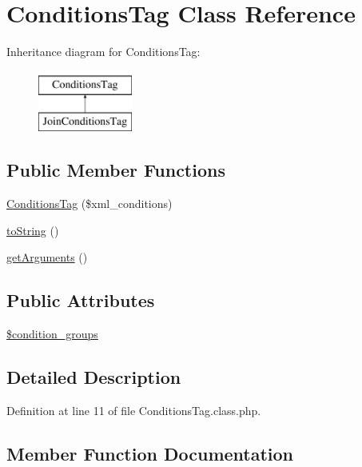 \hypertarget{classConditionsTag}{}\section{Conditions\+Tag Class Reference}
\label{classConditionsTag}
Inheritance diagram for Conditions\+Tag\+:\begin{figure}[H]
\begin{center}
\leavevmode
\includegraphics[height=2.000000cm]{classConditionsTag}
\end{center}
\end{figure}
\subsection*{Public Member Functions}
\begin{DoxyCompactItemize}
\item 
\hyperlink{classConditionsTag_ac5624e3b396995621ca7f0502dc5bd5c}{Conditions\+Tag} (\$xml\+\_\+conditions)
\item 
\hyperlink{classConditionsTag_af458fe76fa1ffb006306c682e024ee5a}{to\+String} ()
\item 
\hyperlink{classConditionsTag_a8c7e8f873db4fa6e6c35920bed31afae}{get\+Arguments} ()
\end{DoxyCompactItemize}
\subsection*{Public Attributes}
\begin{DoxyCompactItemize}
\item 
\hyperlink{classConditionsTag_a494a016d168c8e44cd05638e6c991805}{\$condition\+\_\+groups}
\end{DoxyCompactItemize}


\subsection{Detailed Description}


Definition at line 11 of file Conditions\+Tag.\+class.\+php.



\subsection{Member Function Documentation}
\mbox{\label{classConditionsTag_ac5624e3b396995621ca7f0502dc5bd5c}} 
